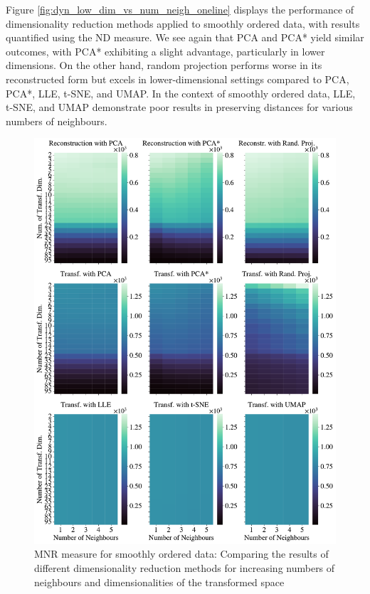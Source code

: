 \documentclass[pdftex,12pt,a4paper]{report}
\begin{document}
Figure \ref{fig:dyn_low_dim_vs_num_neigh_oneline} displays the performance of dimensionality reduction methods applied to smoothly ordered data, with results quantified using the ND measure.
We see again that PCA and PCA* yield similar outcomes, with PCA* exhibiting a slight advantage, particularly in lower dimensions.
On the other hand, random projection performs worse in its reconstructed form but excels in lower-dimensional settings compared to PCA, PCA*, LLE, t-SNE, and UMAP.
In the context of smoothly ordered data, LLE, t-SNE, and UMAP demonstrate poor results in preserving distances for various numbers of neighbours.


\begin{figure}[htb!]
    \includegraphics*[width= \textwidth]{images/multiple_runs/one_line/dyn_low_dim_vs_num_neigh/multiple_scalar_product/all_methods_10runs_5lines_100points_5neighbours.pdf}
    \caption{MNR measure for smoothly ordered data: Comparing the results of different dimensionality reduction methods for increasing numbers of neighbours and dimensionalities of the transformed space} \label{fig:dyn_low_dim_vs_num_neigh_oneline_scal}
\end{figure}
\end{document}
